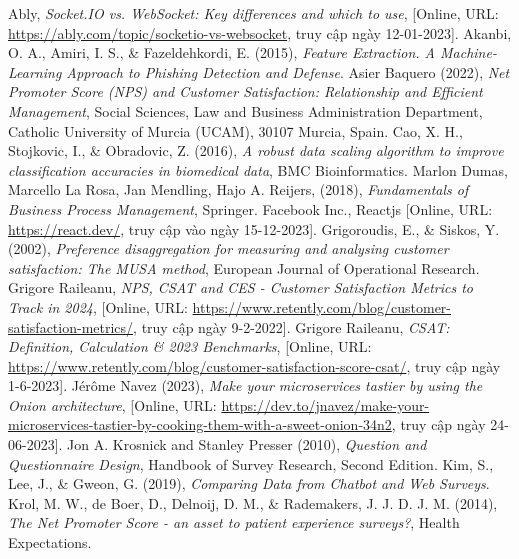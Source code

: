 \begin{thebibliography}{9}
     Ably, \textit{Socket.IO vs. WebSocket: Key differences and which to use}, [Online, URL: \url{https://ably.com/topic/socketio-vs-websocket}, truy cập ngày 12-01-2023].
     Akanbi, O. A., Amiri, I. S., \& Fazeldehkordi, E. (2015), \textit{Feature Extraction. A Machine-Learning Approach to Phishing Detection and Defense}.
     Asier Baquero (2022), \textit{Net Promoter Score (NPS) and Customer Satisfaction: Relationship and Efficient Management}, Social Sciences, Law and Business Administration Department, Catholic University of Murcia (UCAM), 30107 Murcia, Spain.
     Cao, X. H., Stojkovic, I., \& Obradovic, Z. (2016), \textit{A robust data scaling algorithm to improve classification accuracies in biomedical data}, BMC Bioinformatics.
     Marlon Dumas, Marcello La Rosa, Jan Mendling, Hajo A. Reijers, (2018), \textit{Fundamentals of Business Process Management}, Springer.
     Facebook Inc., Reactjs [Online, URL: \url{https://react.dev/}, truy cập vào ngày 15-12-2023].
     Grigoroudis, E., \& Siskos, Y. (2002), \textit{Preference disaggregation for measuring and analysing customer satisfaction: The MUSA method}, European Journal of Operational Research.
     Grigore Raileanu, \textit{NPS, CSAT and CES - Customer Satisfaction Metrics to Track in 2024}, [Online, URL: \url{https://www.retently.com/blog/customer-satisfaction-metrics/}, truy cập ngày 9-2-2022].
     Grigore Raileanu, \textit{CSAT: Definition, Calculation \& 2023 Benchmarks}, [Online, URL: \url{https://www.retently.com/blog/customer-satisfaction-score-csat/}, truy cập ngày 1-6-2023].
     Jérôme Navez (2023), \textit{Make your microservices tastier by using the Onion architecture}, [Online, URL: \href{https://dev.to/jnavez/make-your-microservices-tastier-by-cooking-them-with-a-sweet-onion-34n2}{https://dev.to/jnavez/make-your-microservices-tastier-by-cooking-them-with-a-sweet-onion-34n2}, truy cập ngày 24-06-2023].
     Jon A. Krosnick and Stanley Presser (2010), \textit{Question and Questionnaire Design}, Handbook of Survey Research, Second Edition.
     Kim, S., Lee, J., \& Gweon, G. (2019), \textit{Comparing Data from Chatbot and Web Surveys}.
     Krol, M. W., de Boer, D., Delnoij, D. M., \& Rademakers, J. J. D. J. M. (2014), \textit{The Net Promoter Score - an asset to patient experience surveys?}, Health Expectations.

\end{thebibliography}
